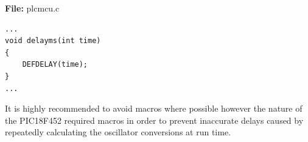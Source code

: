 \textbf{File:} plcmcu.c



\begin{lstlisting}[frame=single]
...
void delayms(int time)
{
	DEFDELAY(time);
}
...
\end{lstlisting}



It is highly recommended to avoid macros where possible however the nature of 
the PIC18F452 required macros in order to prevent inaccurate delays caused by 
repeatedly calculating the oscillator conversions at run time.
